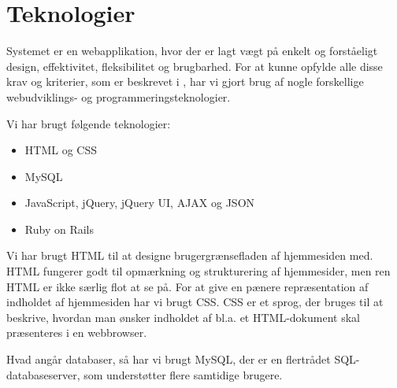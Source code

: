 \section{Teknologier}
\label{sec:teknologier}
Systemet er en webapplikation, hvor der er lagt vægt på enkelt og forståeligt design, effektivitet, fleksibilitet og brugbarhed. For at kunne opfylde alle disse krav og kriterier, som er beskrevet i , har vi gjort brug af nogle forskellige webudviklings- og programmeringsteknologier.

Vi har brugt følgende teknologier:

\begin{itemize}[noitemsep]
\item HTML og CSS
\item MySQL %
\item JavaScript, jQuery, jQuery UI, AJAX og JSON
\item Ruby on Rails
\end{itemize}

Vi har brugt HTML\cite{htmlwiki} til at designe brugergrænsefladen af hjemmesiden med. HTML fungerer godt til opmærkning og strukturering af hjemmesider, men ren HTML er ikke særlig flot at se på. For at give en pænere repræsentation af indholdet af hjemmesiden har vi brugt CSS\cite{csswiki}. CSS er et sprog, der bruges til at beskrive, hvordan man ønsker indholdet af bl.a. et HTML-dokument skal præsenteres i \fx en webbrowser.

Hvad angår databaser, så har vi brugt MySQL\cite{mysqlwiki}, der er en flertrådet SQL-databaseserver, som understøtter flere samtidige brugere. %

